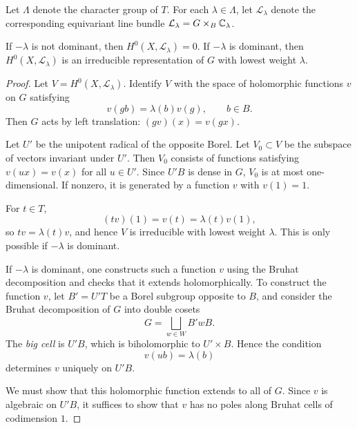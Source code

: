 \documentclass[12pt]{article}
\begin{document}
Let $\Lambda$ denote the character group of $T$. For each $\lambda \in \Lambda$, let $\mathcal L_\lambda$ denote the corresponding equivariant line bundle ${\mathcal{L}}_\lambda = G \times_B \mathbb C_\lambda$.

\begin{theorem}
    If $-\lambda$ is not dominant, then $H^0(X,\mathcal L_\lambda)=0$. If $-\lambda$ is dominant, then $H^0(X,\mathcal L_\lambda)$ is an irreducible representation of $G$ with lowest weight $\lambda$.
\end{theorem}

\begin{proof}
    Let $V = H^0(X,\mathcal L_\lambda)$. Identify $V$ with the space of holomorphic functions $v$ on $G$ satisfying
    \[
        v(gb) = \lambda(b)v(g), \qquad b \in B.
    \]
    Then $G$ acts by left translation: $(gv)(x)=v(gx)$.

    Let $U'$ be the unipotent radical of the opposite Borel. Let $V_0 \subset V$ be the subspace of vectors invariant under $U'$. Then $V_0$ consists of functions satisfying $v(ux)=v(x)$ for all $u \in U'$. Since $U'B$ is dense in $G$, $V_0$ is at most one-dimensional. If nonzero, it is generated by a function $v$ with $v(1)=1$.

    For $t \in T$,
    \[
        (tv)(1) = v(t) = \lambda(t)v(1),
    \]
    so $tv = \lambda(t)v$, and hence $V$ is irreducible with lowest weight $\lambda$. This is only possible if $-\lambda$ is dominant.

    If $-\lambda$ is dominant, one constructs such a function $v$ using the Bruhat decomposition and checks that it extends holomorphically.
    To construct the function $v$, let $B' = U'T$ be a Borel subgroup opposite to $B$, and consider the Bruhat decomposition of $G$ into double cosets
    \[
        G = \bigsqcup_{w \in W} B' w B.
    \]
    The \emph{big cell} is $U'B$, which is biholomorphic to $U' \times B$. Hence the condition
    \[
        v(ub) = \lambda(b)
    \]
    determines $v$ uniquely on $U'B$.

    We must show that this holomorphic function extends to all of $G$. Since $v$ is algebraic on $U'B$, it suffices to show that $v$ has no poles along Bruhat cells of codimension $1$.


\end{proof}
\end{document}
